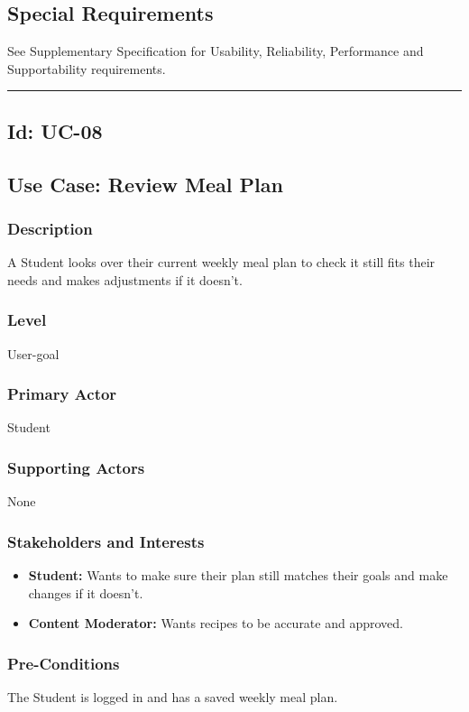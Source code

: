 \documentclass[10pt,letterpaper]{article}
\newcommand{\ucseparator}{\vspace{1em}\noindent\rule{\linewidth}{0.4pt}\vspace{1.5em}}
\begin{document}
\subsection*{Special Requirements}
See Supplementary Specification for Usability, Reliability, Performance and Supportability requirements.

\ucseparator

\subsection*{Id: UC-08}

\subsection*{Use Case: Review Meal Plan}

\subsubsection*{Description}
A Student looks over their current weekly meal plan to check it still fits their needs and makes adjustments if it doesn't.

\subsubsection*{Level}
User-goal

\subsubsection*{Primary Actor}
Student

\subsubsection*{Supporting Actors}
None

\subsubsection*{Stakeholders and Interests}
\begin{itemize}
    \item \textbf{Student:} Wants to make sure their plan still matches their goals and make changes if it doesn't.
    \item \textbf{Content Moderator:} Wants recipes to be accurate and approved.
\end{itemize}

\subsubsection*{Pre-Conditions}
The Student is logged in and has a saved weekly meal plan.
\end{document}
